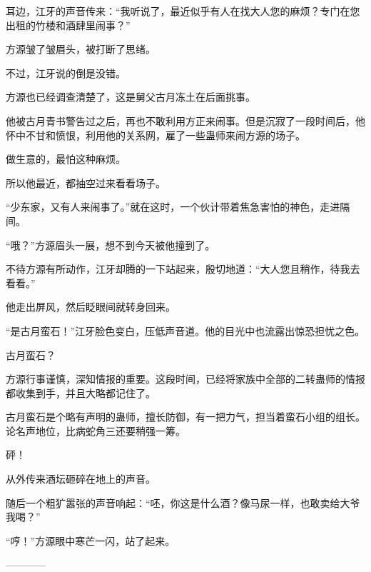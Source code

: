 \begin{this_body}
耳边，江牙的声音传来：“我听说了，最近似乎有人在找大人您的麻烦？专门在您出租的竹楼和酒肆里闹事？”

方源皱了皱眉头，被打断了思绪。

不过，江牙说的倒是没错。

方源也已经调查清楚了，这是舅父古月冻土在后面挑事。

他被古月青书警告过之后，再也不敢利用方正来闹事。但是沉寂了一段时间后，他怀中不甘和愤恨，利用他的关系网，雇了一些蛊师来闹方源的场子。

做生意的，最怕这种麻烦。

所以他最近，都抽空过来看看场子。

“少东家，又有人来闹事了。”就在这时，一个伙计带着焦急害怕的神色，走进隔间。

“哦？”方源眉头一展，想不到今天被他撞到了。

不待方源有所动作，江牙却腾的一下站起来，殷切地道：“大人您且稍作，待我去看看。”

他走出屏风，然后眨眼间就转身回来。

“是古月蛮石！”江牙脸色变白，压低声音道。他的目光中也流露出惊恐担忧之色。

古月蛮石？

方源行事谨慎，深知情报的重要。这段时间，已经将家族中全部的二转蛊师的情报都收集到手，并且大略都记住了。

古月蛮石是个略有声明的蛊师，擅长防御，有一把力气，担当着蛮石小组的组长。论名声地位，比病蛇角三还要稍强一筹。

砰！

从外传来酒坛砸碎在地上的声音。

随后一个粗犷嚣张的声音响起：“呸，你这是什么酒？像马尿一样，也敢卖给大爷我喝？”

“哼！”方源眼中寒芒一闪，站了起来。

------------

\end{this_body}

